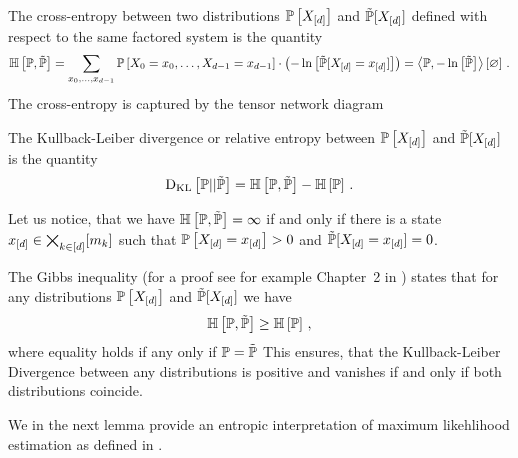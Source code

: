 \begin{definition}
    \label{def:crossEntropy}
    The cross-entropy between two distributions $\mathbb{P}\left[X_{[d]}\right]$ and $\tilde{\mathbb{P}}[X_{[d]}]$ defined with respect to the same factored system is the quantity
    \begin{align*}
        \mathbb{H}\left[\mathbb{P},\tilde{\mathbb{P}}\right]
        = \sum_{x_{0},\ldots,x_{d-1}}  \mathbb{P}\left[X_{0}=x_{0},\ldots,X_{d-1}=x_{d-1}\right] \cdot \left(-\ln \left[ \tilde{\mathbb{P}}[X_{[d]}=x_{[d]}] \right]\right)
        = \left\langle \mathbb{P},-\ln \left[ \tilde{\mathbb{P}} \right]\right\rangle \left[ \varnothing \right] \, .
    \end{align*}
    The cross-entropy is captured by the tensor network diagram
    \begin{center}
        
    \end{center}
    The Kullback-Leiber divergence or relative entropy between $\mathbb{P}\left[X_{[d]}\right]$ and $\tilde{\mathbb{P}}[X_{[d]}]$ is the quantity
    \begin{align*}
        \mathrm{D}_{\mathrm{KL}}\left[ \mathbb{P} || \tilde{\mathbb{P}} \right] = \mathbb{H}\left[\mathbb{P},\tilde{\mathbb{P}}\right] - \mathbb{H}\left[\mathbb{P}\right]  \, .
    \end{align*}
\end{definition}

Let us notice, that we have $\mathbb{H}\left[\mathbb{P},\tilde{\mathbb{P}}\right] = \infty$ if and only if there is a state $x_{[d]}\in\bigtimes_{k\in[d]}[m_{k}]$ such that $\mathbb{P}\left[X_{[d]}=x_{[d]}\right]>0$ and $\tilde{\mathbb{P}}[X_{[d]}=x_{[d]}]=0$.

The Gibbs inequality (for a proof see for example Chapter~2 in \cite{cover_elements_2006}) states that for any distributions $\mathbb{P}\left[X_{[d]}\right]$ and $\tilde{\mathbb{P}}[X_{[d]}]$ we have
\begin{align*}
    \mathbb{H}\left[\mathbb{P},\tilde{\mathbb{P}}\right] \geq \mathbb{H}\left[\mathbb{P}\right] \, ,
\end{align*}
where equality holds if any only if $\mathbb{P}=\tilde{\mathbb{P}}$
This ensures, that the Kullback-Leiber Divergence between any distributions is positive and vanishes if and only if both distributions coincide.

We in the next lemma provide an entropic interpretation of maximum likehlihood estimation as defined in .

